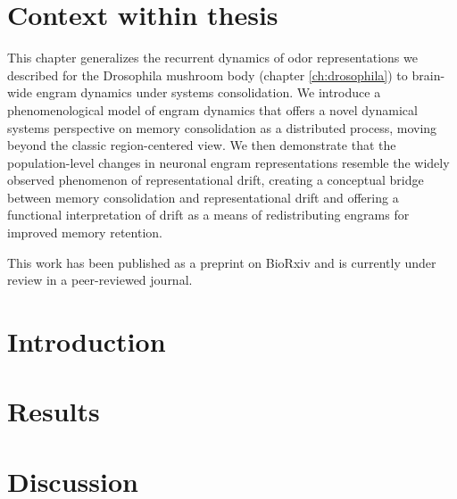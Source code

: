 


\graphicspath{{chapter_engram_dynamics/figures/}}


\section{Context within thesis}
This chapter generalizes the recurrent dynamics of odor representations we described for the Drosophila mushroom body (chapter \ref{ch:drosophila}) to brain-wide engram dynamics under systems consolidation. We introduce a phenomenological model of engram dynamics that offers a novel dynamical systems perspective on memory consolidation as a distributed process, moving beyond the classic region-centered view. We then demonstrate that the population-level changes in neuronal engram representations resemble the widely observed phenomenon of representational drift, creating a conceptual bridge between memory consolidation and representational drift and offering a functional interpretation of drift as a means of redistributing engrams for improved memory retention.

This work has been published as a preprint on BioRxiv \cite{Alevi2026} and is currently under review in a peer-reviewed journal.

%
\section{Introduction}


\section{Results}


\section{Discussion}



